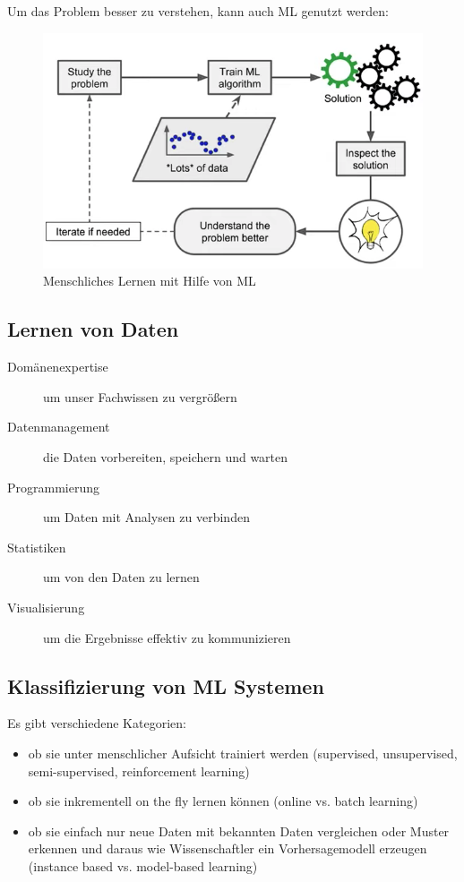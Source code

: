 Um das Problem besser zu verstehen, kann auch ML genutzt werden:
\begin{figure}[h]
  \centering
  \includegraphics[width=0.6\linewidth]{bilder/human_learning_with_ml.png}
  \caption{Menschliches Lernen mit Hilfe von ML}
  \label{fig:human_learning_with_ml}
\end{figure}

\subsection{Lernen von Daten}%
\label{sub:lernen_von_daten}

\begin{description}
  \item[Domänenexpertise] um unser Fachwissen zu vergrößern
  \item[Datenmanagement] die Daten vorbereiten, speichern und warten
  \item[Programmierung] um Daten mit Analysen zu verbinden
  \item[Statistiken] um von den Daten zu lernen
  \item[Visualisierung] um die Ergebnisse effektiv zu kommunizieren
\end{description}

\subsection{Klassifizierung von ML Systemen}%
\label{sub:klassifizierung_von_ml_systemen}

Es gibt verschiedene Kategorien:
\begin{itemize}
  \item ob sie unter menschlicher Aufsicht trainiert werden
    (supervised, unsupervised, semi-supervised, reinforcement learning)
  \item ob sie inkrementell on the fly lernen können (online vs. batch learning)
  \item ob sie einfach nur neue Daten mit bekannten Daten vergleichen
    oder Muster erkennen und daraus wie Wissenschaftler ein Vorhersagemodell erzeugen
    (instance based vs. model-based learning)
\end{itemize}

